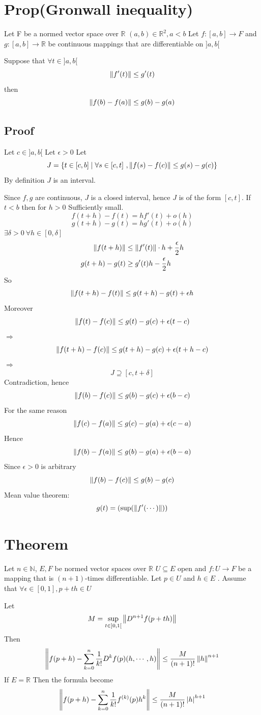 \documentclass{book}
\newcommand{\abs}[1]{\left\lvert #1 \right\rvert}
\begin{document}
\section{Prop(Gronwall inequality)}
Let F be a normed vector space over $\mathbb{R}$ $(a,b)\in \mathbb{R}^2,a<b$ Let $f:[a,b]\rightarrow F$ and $g:[a,b]\rightarrow\mathbb{R}$ be continuous mappings that are differentiable on ${]a,b[}$

Suppose that $\forall t\in {]a,b[}$
$$\left\lVert f'(t) \right\rVert\leq g'(t)$$
then $$\left\lVert f(b)-f(a) \right\rVert\leq g(b)-g(a)$$
\subsection*{Proof}
Let $c\in {]a,b[}$ Let $\epsilon>0$ Let 
$$J=\{t\in [c,b]\mid\forall s\in [c,t]\ ,\norm{f(s)-f(c)}\leq g(s)-g(c)\}$$
By definition $J$ is an interval.

Since $f,g$ are continuous, $J$ is a closed interval, hence $J$ is of the form $[c,t]$. If $t<b$ then for $h>0$ Sufficiently small.
$$f(t+h)-f(t)=hf'(t)+o(h)$$
$$g(t+h)-g(t)=hg'(t)+o(h)$$
$\exists \delta>0\ \forall h\in [0,\delta]$
$$\begin{aligned}
    \left\lVert f(t+h) \right\rVert &\leq \left\lVert f'(t) \right\rVert\cdot h+\frac{\epsilon}{2}h\\
    g(t+h)-g(t) &\geq g'(t)h-\frac{\epsilon}{2}h
\end{aligned}$$
So $$\left\lVert f(t+h)-f(t) \right\rVert\leq g(t+h)-g(t)+\epsilon h$$
Moreover
$$\left\lVert f(t)-f(c) \right\rVert\leq g(t)-g(c)+\epsilon (t-c)$$
$\Rightarrow$
$$\left\lVert f(t+h)-f(c) \right\rVert\leq g(t+h)-g(c)+\epsilon (t+h-c)$$
$\Rightarrow$
$$J\supseteq [c,t+\delta]$$
Contradiction, hence
$$\left\lVert f(b)-f(c) \right\rVert\leq g(b)-g(c)+\epsilon (b-c)$$
For the same reason
$$\left\lVert f(c)-f(a) \right\rVert\leq g(c)-g(a)+\epsilon (c-a)$$
Hence
$$\left\lVert f(b)-f(a) \right\rVert\leq g(b)-g(a)+\epsilon (b-a)$$
Since $\epsilon>0$ is arbitrary
$$\left\lVert f(b)-f(c) \right\rVert\leq g(b)-g(c)$$
Mean value theorem:
$$g(t)=(\sup(\left\lVert f'(\cdots) \right\rVert))$$
\section{Theorem}
Let $n\in \mathbb{N}$, $E,F$ be normed vector spaces over $\mathbb{R}$
$U\subseteq E$ open and $f: U\rightarrow F$ be a mapping that is $(n+1)$-times differentiable. Let $p\in U$ and $h\in E$ . Assume that $\forall \epsilon\in [0,1],p+th\in U$

Let $$M=\sup\limits_{t\in {]0,1[}}\left\lVert D^{n+1}f(p+th) \right\rVert$$
Then $$\left\lVert f(p+h)-\sum\limits_{k=0}^n\frac{1}{k!}D^kf(p)(h,\cdots,h) \right\rVert\leq\frac{M}{(n+1)!}\left\lVert h \right\rVert^{n+1}$$
If $E=\mathbb{R}$ Then the formula become
$$\norm{f(p+h)-\sum\limits_{k=0}^n\frac{1}{k!}f^{(k)}(p)h^k}\leq\frac{M}{(n+1)!}\abs{h}^{h+1}$$
\end{document}
